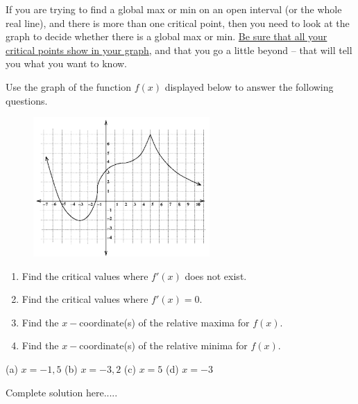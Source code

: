 \begin{tcolorbox}[title={Locating Global Extrema Over An Open Interval}]
\noindent If you are trying to find a global max or min on an open interval (or the whole real line), and there is more than one critical point, then you need to look at the graph to decide whether there is a global max or min. \underline{Be sure that all your critical points show in your graph}, and that you go a little beyond – that will tell you what you want to know.
\end{tcolorbox}
\begin{example}
Use the graph of the function $f(x)$ displayed below to answer the following questions.
\begin{figure}[h]
    \centering
    \includegraphics[width=0.6\textwidth]{images/optimization/exampleGraph1.png}
    \label{fig:my_label}
\end{figure}
\renewcommand{\labelenumi}{(\alph{enumi})}
\begin{enumerate}[leftmargin=*]
    \item Find the critical values where $f'(x)$ does not exist.\vspace{1cm}
    \item Find the critical values where $f'(x)=0$.\vspace{1cm}
    \item Find the $x-$coordinate(s) of the relative maxima for $f(x)$. \vspace{1cm}
    \item Find the $x-$coordinate(s) of the relative minima for $f(x)$. \vspace{1cm}
\end{enumerate}
    \begin{sol}
    (a) $x=-1,5$ (b) $x=-3,2$ (c) $x=5$ (d) $x=-3$
    \end{sol}
    \begin{solL}
    Complete solution here.....
    
    \end{solL}
    
\end{example}

